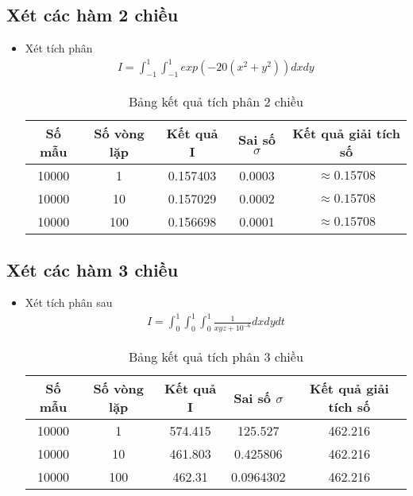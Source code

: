 \subsection{Xét các hàm 2 chiều}\label{subsec:3.2.2}
\begin{itemize}
    \item Xét tích phân 
    \begin{align}
        I=\int_{-1}^{1}\int_{-1}^{1} {exp(-20(x^2+y^2))}dxdy
    \end{align}
    
    \begin{table}[H]
        \centering
        \begin{tabular}{ |c|c|c|c|c| }
         \hline
         \multicolumn{1}{|c}{Số mẫu} & \multicolumn{1}{|c|}{Số vòng lặp} & \multicolumn{1}{|c|}{Kết quả I} & \multicolumn{1}{|c|}{Sai số $\sigma$} & \multicolumn{1}{|c|}{Kết quả giải tích số} \\
         \hline
         10000 & 1  & 0.157403  & 0.0003 & $\approx 0.15708$ \\
         \hline
         10000 & 10  &  0.157029 & 0.0002 & $\approx 0.15708$ \\
         \hline
         10000 & 100  & 0.156698 & 0.0001 & $\approx 0.15708$ \\
         \hline
        \end{tabular}
        \caption{Bảng kết quả tích phân 2 chiều}
        \label{2d_xy}
       \end{table}
    
    

\end{itemize}

\subsection{Xét các hàm 3 chiều}\label{subsec:3.2.3}
\begin{itemize}
    \item Xét tích phân sau 
    \begin{align}
        I=\int_{0}^{1}\int_{0}^{1} \int_{0}^{1} {\frac{1}{xyz+10^{-6}}}dxdydt
    \end{align}
    \begin{table}[H]
        \centering
        \begin{tabular}{ |c|c|c|c|c| }
         \hline
         \multicolumn{1}{|c}{Số mẫu} & \multicolumn{1}{|c|}{Số vòng lặp} & \multicolumn{1}{|c|}{Kết quả I} & \multicolumn{1}{|c|}{Sai số $\sigma$} & \multicolumn{1}{|c|}{Kết quả giải tích số} \\
         \hline
         10000 & 1  & 574.415  & 125.527 & 462.216 \\
         \hline
         10000 & 10  & 461.803  & 0.425806 & 462.216 \\
         \hline
         10000 & 100  & 462.31 & 0.0964302 & 462.216 \\
         \hline
        \end{tabular}
        \caption{Bảng kết quả tích phân 3 chiều}
        \label{3d_xyz}
       \end{table}
\end{itemize}

